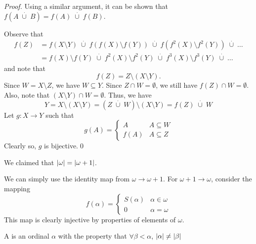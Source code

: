 \documentclass[notoc,notitlepage]{tufte-book}
\newcommand{\discup}{\; \overset{\cdot}{\cup} \;}
\begin{document}
\begin{proof}
  Using a similar argument, it can be shown that $f(A \discup B) = f(A) \discup f(B)$.

  Observe that
  \begin{align*}
    f(Z) &= f(X \setminus Y) \discup f( f(X) \setminus f(Y) ) \discup f ( f^2(X) \setminus f^2(Y) ) \discup \hdots \\
         &= f(X) \setminus f(Y) \discup f^2(X) \setminus f^2(Y) \discup f^3(X) \setminus f^3(Y) \discup \hdots
  \end{align*}
  and note that
  \begin{equation*}
    f(Z) = Z \setminus ( X \setminus Y ).
  \end{equation*}
  Since $W = X \setminus Z$, we have $W \subseteq Y$. Since $Z \cap W = \emptyset$, we still have $f(Z) \cap W = \emptyset$. Also, note that $( X \setminus Y ) \cap W = \emptyset$. Thus, we have
  \begin{equation*}
    Y = X \setminus ( X \setminus Y ) = (Z \discup W) \setminus (X \setminus Y) = f(Z) \discup W
  \end{equation*}
  Let $g : X \to Y$ such that
  \begin{equation*}
    g(A) = \begin{cases}
      A    & A \subseteq W \\
      f(A) & A \subseteq Z
    \end{cases}
  \end{equation*}
  Clearly so, $g$ is bijective.\qed
\end{proof}

\begin{eg}
  We claimed that $\left|\omega\right| = \left|\omega + 1\right|$.

  We can simply use the identity map from $\omega \to \omega + 1$. For $\omega + 1 \to \omega$, consider the mapping
  \begin{equation*}
    f(\alpha) = \begin{cases}
      S(\alpha) & \alpha \in \omega \\
      0         & \alpha = \omega
    \end{cases}
  \end{equation*}
  This map is clearly injective by properties of elements of $\omega$.
\end{eg}

\begin{defn}[Cardinal]
\label{defn:cardinal}
  A  is an ordinal $\alpha$ with the property that $\forall \beta < \alpha$, $\left|\alpha\right| \neq \left|\beta\right|$
\end{defn}
\end{document}
